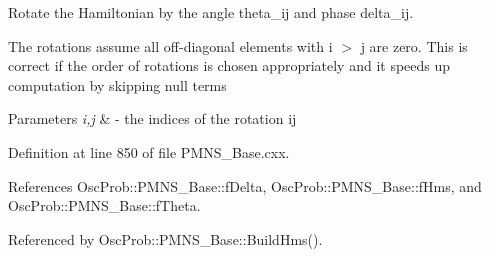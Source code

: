 Rotate the Hamiltonian by the angle theta\+\_\+ij and phase delta\+\_\+ij.

The rotations assume all off-\/diagonal elements with i $>$ j are zero. This is correct if the order of rotations is chosen appropriately and it speeds up computation by skipping null terms


\begin{DoxyParams}{Parameters}
{\em i,j} & -\/ the indices of the rotation ij \\
\hline
\end{DoxyParams}


Definition at line 850 of file P\+M\+N\+S\+\_\+\+Base.\+cxx.



References Osc\+Prob\+::\+P\+M\+N\+S\+\_\+\+Base\+::f\+Delta, Osc\+Prob\+::\+P\+M\+N\+S\+\_\+\+Base\+::f\+Hms, and Osc\+Prob\+::\+P\+M\+N\+S\+\_\+\+Base\+::f\+Theta.



Referenced by Osc\+Prob\+::\+P\+M\+N\+S\+\_\+\+Base\+::\+Build\+Hms().


